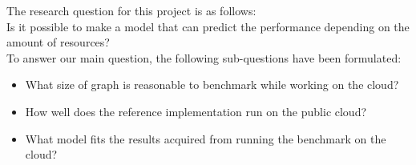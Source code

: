 The research question for this project is as follows: \\
Is it possible to make a model that can predict the performance depending on the amount of resources? \\
To answer our main question, the following sub-questions have been formulated: 
\begin{itemize}
\item What size of graph is reasonable to benchmark while working on the cloud?
\item How well does the reference implementation\cite{graph500-code} run on the public cloud?
\item What model fits the results acquired from running the benchmark on the cloud?
\end{itemize}